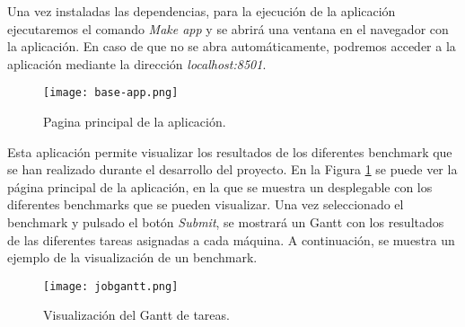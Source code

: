 Una vez instaladas las dependencias, para la ejecución de la aplicación
ejecutaremos el comando \textit{Make app} y se abrirá una ventana en el
navegador con la aplicación. En caso de que no se abra automáticamente,
podremos acceder a la aplicación mediante la dirección \textit{localhost:8501}.

\begin{figure}[ht]
    \centering
    \texttt{[image: base-app.png]}
    \caption{Pagina principal de la aplicación.}
    \label{fig:demo}
\end{figure}

Esta aplicación permite visualizar los resultados de los diferentes
benchmark que se han realizado durante el desarrollo del proyecto. En la
Figura \ref{fig:demo} se puede ver la página principal de la aplicación,
en la que se muestra un desplegable con los diferentes benchmarks que se
pueden visualizar. Una vez seleccionado el benchmark y pulsado el botón
\textit{Submit}, se mostrará un Gantt con los resultados de las diferentes
tareas asignadas a cada máquina. A continuación, se muestra un ejemplo de
la visualización de un benchmark.

\begin{figure}[ht]
    \centering
    \texttt{[image: jobgantt.png]}
    \caption{Visualización del Gantt de tareas.}
    \label{fig:demo-2}
\end{figure}

\pagebreak
